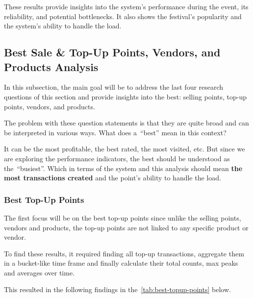 These results provide insights into the system's performance during the event, its reliability, and potential bottlenecks.
It also shows the festival's popularity and the system's ability to handle the load.


\subsection{Best Sale \& Top-Up Points, Vendors, and Products Analysis}
\label{subsec:analysis-performance-indicators-best}
In this subsection, the main goal will be to address the last four research questions of this section and provide insights into the best: selling points, top-up points, vendors, and products.

The problem with these question statements is that they are quite broad and can be interpreted in various ways.
What does a~\enquote{best} mean in this context?

It can be the most profitable, the best rated, the most visited, etc.
But since we are exploring the performance indicators, the best should be understood as the~\enquote{busiest}.
Which in terms of the system and this analysis should mean \textbf{the most transactions created} and the point's ability to handle the load.


\subsubsection{Best Top-Up Points}
\label{subsubsec:analysis-best-top-up-points}
The first focus will be on the best top-up points since unlike the selling points, vendors and products, the top-up points are not linked to any specific product or vendor.
\begin{rqbox}
	\textit{}
\end{rqbox}

To find these results, it required finding all top-up transactions, aggregate them in a bucket-like time frame and finally calculate their total counts, max peaks and averages over time.

This resulted in the following findings in the~\autoref{tab:best-topup-points} below.

